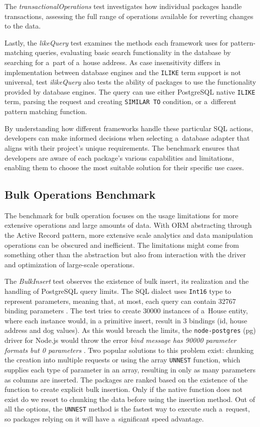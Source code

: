 The \textit{transactionalOperations} test investigates how individual packages
handle transactions, assessing the full range of operations available for
reverting changes to the data.

Lastly, the \textit{likeQuery} test examines the methods each framework uses for
pattern-matching queries, evaluating basic search functionality in the database
by searching for a~part of a~house address. As case insensitivity differs in
implementation between database engines and the \texttt{ILIKE} term support is
not universal, test \textit{ilikeQuery} also tests the ability of packages to
use the functionality provided by database engines. The query can use either
PostgreSQL native \texttt{ILIKE} term, parsing the request and creating
\texttt{SIMILAR TO} condition, or a~different pattern matching function. 

By understanding how different frameworks handle these particular SQL actions,
developers can make informed decisions when selecting a~database adapter that
aligns with their project's unique requirements. The benchmark ensures that
developers are aware of each package's various capabilities and limitations,
enabling them to choose the most suitable solution for their specific use cases.

\subsection{Bulk Operations Benchmark}
The benchmark for bulk operation focuses on the usage limitations for more
extensive operations and large amounts of data. With ORM abstracting through the
Active Record pattern, more extensive scale analytics and data manipulation
operations can be obscured and inefficient. The limitations might come from
something other than the abstraction but also from interaction with the driver
and optimization of large-scale operations.

The \textit{BulkInsert} test observes the existence of bulk insert, its
realization and the handling of PostgreSQL query limits. The SQL dialect uses
\texttt{Int16} type to represent parameters, meaning that, at most, each query
can contain 32767 binding parameters \cite{postgresMessageFormats}. The test
tries to create 30000 instances of a~House entity, where each instance would, in
a primitive insert, result in 3 bindings (id, house address and dog values). As
this would breach the limits, the \texttt{node-postgres} (pg) driver for Node.js
would throw the error \textit{bind message has 90000 parameter formats but 0
parameters} \cite{nodePostgresParameterLimit}. Two popular solutions to this
problem exist: chunking the creation into multiple requests or using the array
\texttt{UNNEST} function, which supplies each type of parameter in an array,
resulting in only as many parameters as columns are inserted. The packages are
ranked based on the existence of the function to create explicit bulk insertion.
Only if the native function does not exist do we resort to chunking the data
before using the insertion method. Out of all the options, the \texttt{UNNEST}
method is the fastest way to execute such a~request, so packages relying on it
will have a~significant speed advantage.

